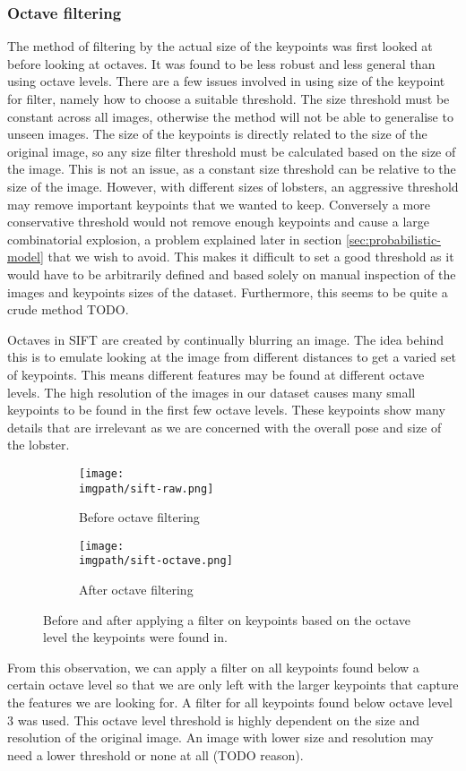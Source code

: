 \subsubsection{Octave filtering}
The method of filtering by the actual size of the keypoints was first looked at before looking at octaves. It was found to be less robust and less general than using octave levels. There are a few issues involved in using size of the keypoint for filter, namely how to choose a suitable threshold. The size threshold must be constant across all images, otherwise the method will not be able to generalise to unseen images. The size of the keypoints is directly related to the size of the original image, so any size filter threshold must be calculated based on the size of the image. This is not an issue, as a constant size threshold can be relative to the size of the image. However, with different sizes of lobsters, an aggressive threshold may remove important keypoints that we wanted to keep. Conversely a more conservative threshold would not remove enough keypoints and cause a large combinatorial explosion, a problem explained later in section \ref{sec:probabilistic-model} that we wish to avoid. This makes it difficult to set a good threshold as it would have to be arbitrarily defined and based solely on manual inspection of the images and keypoints sizes of the dataset. Furthermore, this seems to be quite a crude method TODO. 

Octaves in SIFT are created by continually blurring an image. The idea behind this is to emulate looking at the image from different distances to get a varied set of keypoints. This means different features may be found at different octave levels. The high resolution of the images in our dataset causes many small keypoints to be found in the first few octave levels. These keypoints show many details that are irrelevant as we are concerned with the overall pose and size of the lobster.

\begin{figure}[H]
	\begin{subfigure}{0.5\textwidth}
	\texttt{[image: \\imgpath/sift-raw.png]}
	\caption{Before octave filtering}
	\end{subfigure}
	\hspace*{\fill}
	\begin{subfigure}{0.5\textwidth}
	\texttt{[image: \\imgpath/sift-octave.png]}
	\caption{After octave filtering}
	\end{subfigure}
\caption{Before and after applying a filter on keypoints based on the octave level the keypoints were found in.}
\end{figure}
\noindent
From this observation, we can apply a filter on all keypoints found below a certain octave level so that we are only left with the larger keypoints that capture the features we are looking for. A filter for all keypoints found below octave level 3 was used. This octave level threshold is highly dependent on the size and resolution of the original image. An image with lower size and resolution may need a lower threshold or none at all (TODO reason). 


